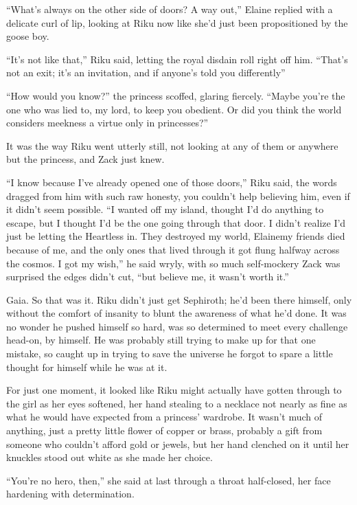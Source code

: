 ``What's always on the other side of doors? A way out,'' Elaine replied with a delicate curl of lip, looking at Riku now like she'd just been propositioned by the goose boy.

``It's not like that,'' Riku said, letting the royal disdain roll right off him. ``That's not an exit; it's an invitation, and if anyone's told you differently\textemdash ''

``How would you know?'' the princess scoffed, glaring fiercely. ``Maybe you're the one who was lied to, my lord, to keep you obedient. Or did you think the world considers meekness a virtue only in princesses?''

It was the way Riku went utterly still, not looking at any of them or anywhere but the princess, and Zack just knew.

``I know because I've already opened one of those doors,'' Riku said, the words dragged from him with such raw honesty, you couldn't help believing him, even if it didn't seem possible. ``I wanted off my island, thought I'd do anything to escape, but I thought I'd be the one going through that door. I didn't realize I'd just be letting the Heartless in. They destroyed my world, Elaine\textemdash my friends died because of me, and the only ones that lived through it got flung halfway across the cosmos. I got my wish,'' he said wryly, with so much self-mockery Zack was surprised the edges didn't cut, ``but believe me, it wasn't worth it.''

Gaia. So that was it. Riku didn't just get Sephiroth; he'd been there himself, only without the comfort of insanity to blunt the awareness of what he'd done. It was no wonder he pushed himself so hard, was so determined to meet every challenge head-on, by himself. He was probably still trying to make up for that one mistake, so caught up in trying to save the universe he forgot to spare a little thought for himself while he was at it.

For just one moment, it looked like Riku might actually have gotten through to the girl as her eyes softened, her hand stealing to a necklace not nearly as fine as what he would have expected from a princess' wardrobe. It wasn't much of anything, just a pretty little flower of copper or brass, probably a gift from someone who couldn't afford gold or jewels, but her hand clenched on it until her knuckles stood out white as she made her choice.

``You're no hero, then,'' she said at last through a throat half-closed, her face hardening with determination.

